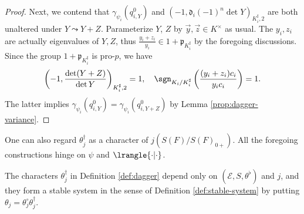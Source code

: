 \documentclass[a4paper,10pt]{article}
\begin{document}
\begin{proof}
	Next, we contend that $\gamma_{\psi_i}(q_{i,Y}^0)$ and $(-1, \mathfrak{d}_i (-1)^n \det Y)_{K_i^\sharp, 2}$ are both unaltered under $Y \leadsto Y+Z$. Parameterize $Y$, $Z$ by $\vec{y}, \vec{z} \in K^\times$ as usual. The $y_i, z_i$ are actually eigenvalues of $Y, Z$, thus $\frac{y_i + z_i}{y_i} \in 1 + \mathfrak{p}_{K_i^\sharp}$ by the foregoing discussions. Since the group $1 + \mathfrak{p}_{K_i^\sharp}$ is pro-$p$, we have
	\[ \left( -1, \frac{\det(Y+Z)}{\det Y} \right)_{K_i^\sharp, 2} = 1, \quad \sgn_{K_i/K_i^\sharp}\left( \dfrac{(y_i + z_i)c_i}{y_i c_i} \right) = 1. \]
	The latter implies $\gamma_{\psi_i}(q_{i,Y}^0) = \gamma_{\psi_i}(q_{i,Y+Z}^0)$ by Lemma \ref{prop:dagger-variance}.
\end{proof}

One can also regard $\theta^\dagger_j$ as a character of $j(S(F)/S(F)_{0+})$. All the foregoing constructions hinge on $\psi$ and $\lrangle{\cdot|\cdot}$.
\begin{theorem}\label{prop:dagger-SS}
	The characters $\theta^\dagger_j$ in Definition \ref{def:dagger} depend only on $(\mathcal{E}, S, \theta^\flat)$ and $j$, and they form a stable system in the sense of Definition \ref{def:stable-system} by putting $\theta_j = \theta_j^\circ \theta_j^\dagger$.
\end{theorem}
\end{document}
